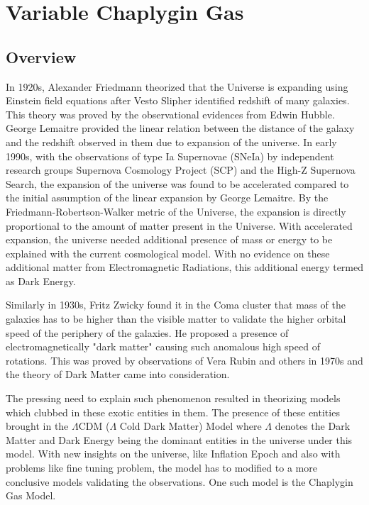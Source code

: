 \chapter{Variable Chaplygin Gas}
\label{sec:2}
\section{Overview}
In 1920s, Alexander Friedmann theorized that the Universe is expanding using Einstein field equations after Vesto Slipher identified redshift of many galaxies. This theory was proved by the observational evidences from Edwin Hubble. George Lemaitre provided the linear relation between the distance of the galaxy and the redshift observed in them due to expansion of the universe. 
In early 1990s, with the observations of type Ia Supernovae (SNeIa) by independent research groups Supernova Cosmology Project (SCP) and the High-Z Supernova Search, the expansion of the universe was found to be accelerated compared to the initial assumption of the linear expansion by George Lemaitre. By the Friedmann-Robertson-Walker metric of the Universe, the expansion is directly proportional to the amount of matter present in the Universe. With accelerated expansion, the universe needed additional presence of mass or energy to be explained with the current cosmological model. With no evidence on these additional matter from Electromagnetic Radiations, this additional energy termed as Dark Energy. 

Similarly in 1930s, Fritz Zwicky found it in the Coma cluster that mass of the galaxies has to be higher than the visible matter to validate the higher orbital speed of the periphery of the galaxies. He proposed a presence of electromagnetically "dark matter" causing such anomalous high speed of rotations. This was proved by observations of Vera Rubin and others in 1970s and the theory of Dark Matter came into consideration.  

The pressing need to explain such phenomenon resulted in theorizing models which clubbed in these exotic entities in them. The presence of these entities brought in the $\Lambda$CDM ($\Lambda$ Cold Dark Matter) Model where $\Lambda$ denotes the Dark Matter and Dark Energy being the dominant entities in the universe under this model. With new insights on the universe, like Inflation Epoch and also with problems like fine tuning problem, the model has to modified to a more conclusive models validating the observations. One such model is the Chaplygin Gas Model.
 
